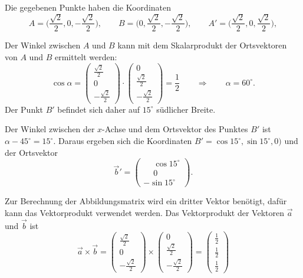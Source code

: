 \begin{loesung}
Die gegebenen Punkte haben die Koordinaten
\[
A
=
\biggl(\frac{\!\sqrt{2}}{2},0,-\frac{\!\sqrt{2}}{2}\biggr),
\qquad
B
=
\biggl(0, \frac{\!\sqrt{2}}{2},-\frac{\!\sqrt{2}}{2}\biggr),
\qquad
A'
=
\biggl(\frac{\!\sqrt{2}}{2},0,\frac{\!\sqrt{2}}{2}\biggr),
\]
\begin{teilaufgaben}
\item
Der Winkel zwischen $A$ und $B$ kann mit dem Skalarprodukt der
Ortsvektoren von $A$ und $B$ ermittelt werden:
\[
\cos\alpha
=
\begin{pmatrix}
\frac{\!\sqrt{2}}{2}\\0\\-\frac{\!\sqrt{2}}{2}
\end{pmatrix}
\cdot
\begin{pmatrix}
0\\ \frac{\!\sqrt{2}}{2}\\-\frac{\!\sqrt{2}}{2}
\end{pmatrix}
=
\frac12
\qquad\Rightarrow\qquad
\alpha=60^\circ.
\]
Der Punkt $B'$ befindet sich daher auf $15^\circ$ südlicher Breite.
\item
Der Winkel zwischen der $x$-Achse und dem Ortsvektor des
Punktes $B'$ ist $\alpha-45^\circ=15^\circ$.
Daraus ergeben sich die Koordinaten $B'=\cos 15^\circ,\sin 15^\circ,0)$
und der Ortsvektor
\[
\vec{b}' = \begin{pmatrix}
\phantom{-}\cos 15^\circ \\
\phantom{-}0\\
-\sin 15^\circ 
\end{pmatrix}.
\]
\item 
Zur Berechnung der Abbildungsmatrix wird ein dritter Vektor
benötigt, dafür kann das Vektorprodukt verwendet werden.
Das Vektorprodukt der Vektoren $\vec{a}$ und $\vec{b}$ ist
\[
\vec{a}\times\vec{b}
=
\begin{pmatrix}
\frac{\!\sqrt{2}}{2}\\0\\-\frac{\!\sqrt{2}}{2}
\end{pmatrix}
\times
\begin{pmatrix}
0\\ \frac{\!\sqrt{2}}{2}\\-\frac{\!\sqrt{2}}{2}
\end{pmatrix}
=
\begin{pmatrix}
\frac12\\
\frac12\\
\frac12
\end{pmatrix}
\]
\end{teilaufgaben}
\end{loesung}
